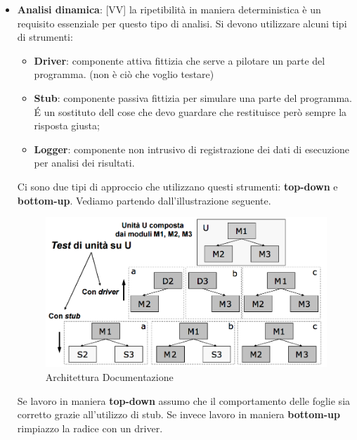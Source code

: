 \begin{itemize}
	\item \textbf{Analisi dinamica}: [VV] la ripetibilità in maniera deterministica è un requisito essenziale per questo tipo di analisi. Si devono utilizzare alcuni tipi di strumenti:
		\begin{itemize}
			\item \textbf{Driver}: componente attiva fittizia che serve a pilotare un parte del programma. (non è ciò che voglio testare)
			\item \textbf{Stub}: componente passiva fittizia per simulare una parte del programma. \'E un sostituto dell cose che devo guardare che restituisce però sempre la risposta giusta;
			\item \textbf{Logger}: componente non intrusivo di registrazione dei dati di esecuzione per analisi dei risultati.
		\end{itemize}
		\noindent
		Ci sono due tipi di approccio che utilizzano questi strumenti: \textbf{top-down} e \textbf{bottom-up}. Vediamo partendo dall'illustrazione seguente.
		\begin{figure}[htbp]
			\centering
			\includegraphics[scale=0.45]{img/stub_driver.png}
			\caption{Architettura Documentazione}
			\label{fig:arch_doc}
		\end{figure}
		Se lavoro in maniera \textbf{top-down} assumo che il comportamento delle foglie sia corretto grazie all'utilizzo di stub. Se invece lavoro in maniera \textbf{bottom-up} rimpiazzo la radice con un driver.








\end{itemize}

